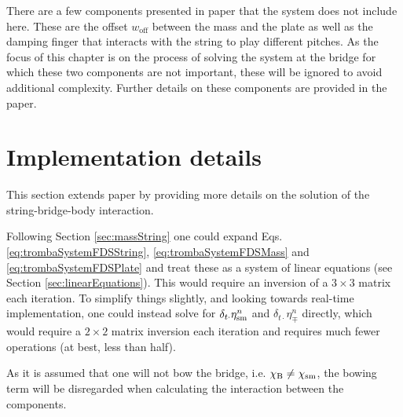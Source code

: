 There are a few components presented in paper \citeP[D] that the system does not include here. These are the offset $w_\text{off}$ between the mass and the plate as well as the damping finger that interacts with the string to play different pitches. As the focus of this chapter is on the process of solving the system at the bridge for which these two components are not important, these will be ignored to avoid additional complexity. Further details on these components are provided in the paper.

\section{Implementation details}
This section extends paper \citeP[D] by providing more details on the solution of the string-bridge-body interaction.

Following Section \ref{sec:massString} one could expand Eqs. \eqref{eq:trombaSystemFDSString}, \eqref{eq:trombaSystemFDSMass} and \eqref{eq:trombaSystemFDSPlate} and treat these as a system of linear equations (see Section \ref{sec:linearEquations}). This would require an inversion of a $3\times 3$ matrix each iteration.
To simplify things slightly, and looking towards real-time implementation, one could instead solve for $\delta_{t\cdot}\eta_{\text{sm}}^n$ and $\delta_{t\cdot}\eta_\mp^n$ directly, which would require a $2\times 2$ matrix inversion each iteration and requires much fewer operations (at best, less than half).

As it is assumed that one will not bow the bridge, i.e. $\chi_\text{B} \neq \chi_{\text{sm}}$, the bowing term will be disregarded when calculating the interaction between the components. 

